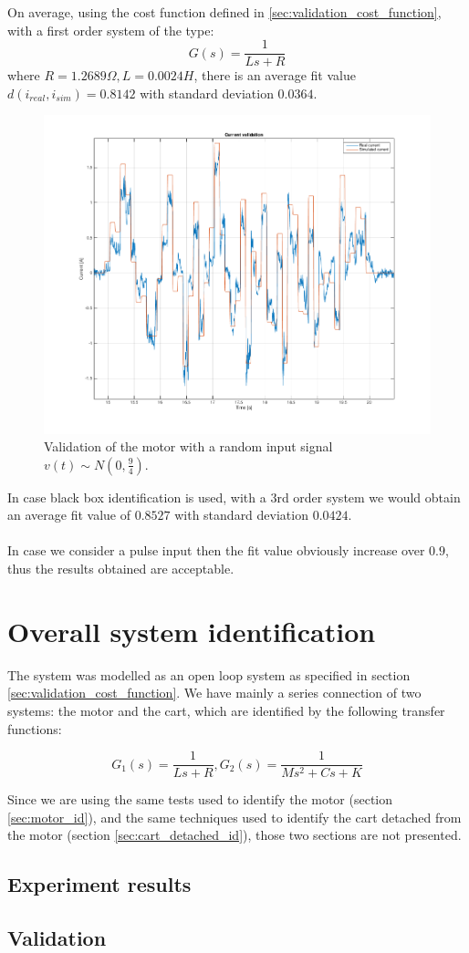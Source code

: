 On average, using the cost function defined in \ref{sec:validation_cost_function}, with a first order system of the type:
$$G(s) = \frac{1}{Ls+R}$$
where $R=1.2689 \Omega, L=0.0024 H$, there is an average fit value $d(i_{real},i_{sim})=0.8142$ with standard deviation $0.0364$.
\begin{figure}[!h]
    \centering
    \includegraphics[width=1\textwidth]{img/motor_validation.png}
    \caption{Validation of the motor with a random input signal $v(t) \sim N(0,\frac{9}{4})$.}
    \label{fig:motor_validation}
\end{figure}
In case black box identification is used, with a $3$rd order system we would obtain an average fit value of $0.8527$ with standard deviation $0.0424$. \\ \\
In case we consider a pulse input then the fit value obviously increase over $0.9$, thus the results obtained are acceptable.
\newpage
\section{Overall system identification}
The system was modelled as an open loop system as specified in section \ref{sec:validation_cost_function}.
We have mainly  a series connection of two systems: the motor and the cart, which are identified by the following transfer functions:

$$G_1(s) = \frac{1}{Ls+R}, G_2(s) = \frac{1}{Ms^2+Cs+K}$$

Since we are using the same tests used to identify the motor (section \ref{sec:motor_id}), and the same techniques used to identify the cart detached from the motor (section \ref{sec:cart_detached_id}), those two sections are not presented.
\subsection{Experiment results}
\subsection{Validation}